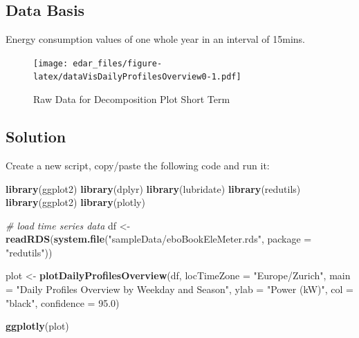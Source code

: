 \documentclass[
]{book}
\newenvironment{Shaded}{\begin{snugshade}}{\end{snugshade}}
\newcommand{\CommentTok}[1]{\textcolor[rgb]{0.56,0.35,0.01}{\textit{#1}}}
\newcommand{\DataTypeTok}[1]{\textcolor[rgb]{0.13,0.29,0.53}{#1}}
\newcommand{\FloatTok}[1]{\textcolor[rgb]{0.00,0.00,0.81}{#1}}
\newcommand{\KeywordTok}[1]{\textcolor[rgb]{0.13,0.29,0.53}{\textbf{#1}}}
\newcommand{\NormalTok}[1]{#1}
\newcommand{\StringTok}[1]{\textcolor[rgb]{0.31,0.60,0.02}{#1}}
\let\oldShaded\Shaded
\let\endoldShaded\endShaded
\renewenvironment{Shaded}{\footnotesize\oldShaded}{\endoldShaded}
\begin{document}
\hypertarget{data-basis-8}{%
\subsection{Data Basis}\label{data-basis-8}}

Energy consumption values of one whole year in an interval of 15mins.

\begin{figure}
\centering
\texttt{[image: edar\_files/figure-latex/dataVisDailyProfilesOverview0-1.pdf]}
\caption{\label{fig:dataVisDailyProfilesOverview0}Raw Data for Decomposition Plot Short Term}
\end{figure}

\hypertarget{solution-8}{%
\subsection{Solution}\label{solution-8}}

Create a new script, copy/paste the following code and run it:

\begin{Shaded}
\begin{Highlighting}[]
\KeywordTok{library}\NormalTok{(ggplot2)}
\KeywordTok{library}\NormalTok{(dplyr)}
\KeywordTok{library}\NormalTok{(lubridate)}
\KeywordTok{library}\NormalTok{(redutils)}
\KeywordTok{library}\NormalTok{(ggplot2)}
\KeywordTok{library}\NormalTok{(plotly)}

\CommentTok{# load time series data}
\NormalTok{df <-}\StringTok{ }\KeywordTok{readRDS}\NormalTok{(}\KeywordTok{system.file}\NormalTok{(}\StringTok{"sampleData/eboBookEleMeter.rds"}\NormalTok{, }\DataTypeTok{package =} \StringTok{"redutils"}\NormalTok{))}

\NormalTok{plot <-}\StringTok{ }\KeywordTok{plotDailyProfilesOverview}\NormalTok{(df,}
                               \DataTypeTok{locTimeZone =} \StringTok{"Europe/Zurich"}\NormalTok{,}
                               \DataTypeTok{main =} \StringTok{"Daily Profiles Overview by Weekday and Season"}\NormalTok{,}
                               \DataTypeTok{ylab =} \StringTok{"Power (kW)"}\NormalTok{,}
                               \DataTypeTok{col =} \StringTok{"black"}\NormalTok{,}
                               \DataTypeTok{confidence =} \FloatTok{95.0}\NormalTok{)}

\KeywordTok{ggplotly}\NormalTok{(plot)}
\end{Highlighting}
\end{Shaded}
\end{document}
